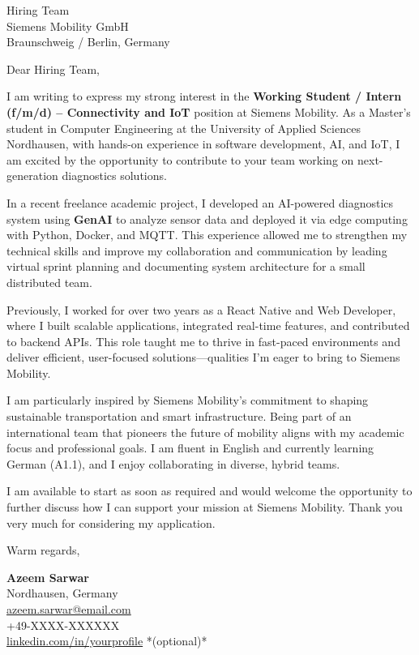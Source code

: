 \documentclass[a4paper,10pt]{letter}
\begin{document}
\begin{letter}{Hiring Team\\
Siemens Mobility GmbH\\
Braunschweig / Berlin, Germany}

\opening{Dear Hiring Team,}

I am writing to express my strong interest in the \textbf{Working Student / Intern (f/m/d) – Connectivity and IoT} position at Siemens Mobility. As a Master's student in Computer Engineering at the University of Applied Sciences Nordhausen, with hands-on experience in software development, AI, and IoT, I am excited by the opportunity to contribute to your team working on next-generation diagnostics solutions.

In a recent freelance academic project, I developed an AI-powered diagnostics system using \textbf{GenAI} to analyze sensor data and deployed it via edge computing with Python, Docker, and MQTT. This experience allowed me to strengthen my technical skills and improve my collaboration and communication by leading virtual sprint planning and documenting system architecture for a small distributed team.

Previously, I worked for over two years as a React Native and Web Developer, where I built scalable applications, integrated real-time features, and contributed to backend APIs. This role taught me to thrive in fast-paced environments and deliver efficient, user-focused solutions—qualities I’m eager to bring to Siemens Mobility.

I am particularly inspired by Siemens Mobility’s commitment to shaping sustainable transportation and smart infrastructure. Being part of an international team that pioneers the future of mobility aligns with my academic focus and professional goals. I am fluent in English and currently learning German (A1.1), and I enjoy collaborating in diverse, hybrid teams.

I am available to start as soon as required and would welcome the opportunity to further discuss how I can support your mission at Siemens Mobility. Thank you very much for considering my application.

\closing{Warm regards,}

\vspace{0.5cm}
\noindent\textbf{Azeem Sarwar}\\
Nordhausen, Germany\\
\href{mailto:azeem.sarwar@email.com}{azeem.sarwar@email.com} \\
+49-XXXX-XXXXXX \\
\href{https://www.linkedin.com/in/yourprofile}{linkedin.com/in/yourprofile} *(optional)*

\end{letter}
\end{document}
